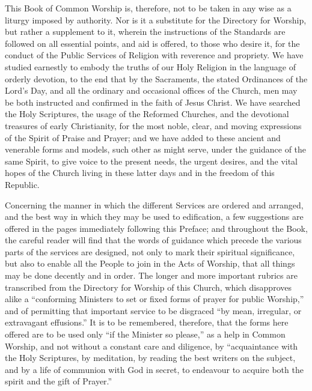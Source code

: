 This Book of Common Worship is, therefore, not to be taken in any wise as a liturgy imposed by authority.
Nor is it a substitute for the Directory for Worship, but rather a supplement to it, wherein the instructions of the Standards are followed on all essential points, and aid is offered, to those who desire it, for the conduct of the Public Services of Religion with reverence and propriety.
We have studied earnestly to embody the truths of our Holy Religion in the language of orderly devotion, to the end that by the Sacraments, the stated Ordinances of the Lord's Day, and all the ordinary and occasional offices of the Church, men may be both instructed and confirmed in the faith of Jesus Christ.
We have searched the Holy Scriptures, the usage of the Reformed Churches, and the devotional treasures of early Christianity, for the most noble, clear, and moving expressions of the Spirit of Praise and Prayer; and we have added to these ancient and venerable forms and models, such other as might serve, under the guidance of the same Spirit, to give voice to the present needs, the urgent desires, and the vital hopes of the Church living in these latter days and in the freedom of this Republic.

Concerning the manner in which the different Services are ordered and arranged, and the best way in which they may be used to edification, a few suggestions are offered in the pages immediately following this Preface; and throughout the Book, the careful reader will find that the words of guidance which precede the various parts of the services are designed, not only to mark their spiritual significance, but also to enable all the People to join in the Acts of Worship, that all things may be done decently and in order.
The longer and more important rubrics are transcribed from the Directory for Worship of this Church, which disapproves alike a ``conforming Ministers to set or fixed forms of prayer for public Worship,'' and of permitting that important service to be disgraced ``by mean, irregular, or extravagant effusions.''
It is to be remembered, therefore, that the forms here offered are to be used only ``if the Minister so please,'' as a help in Common Worship, and not without a constant care and diligence, by ``acquaintance with the Holy Scriptures, by meditation, by reading the best writers on the subject, and by a life of communion with God in secret, to endeavour to acquire both the spirit and the gift of Prayer.''

